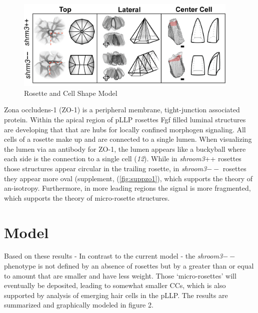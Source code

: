 \documentclass[11pt,singlespacinge,twoside]{reedthesis} %
\begin{document}
\begin{figure}

{\centering \includegraphics[width=0.95\textwidth]{figures/summary/cell-model} 

}

\caption[Rosette and Cell Shape Model]{Rosette and Cell Shape Model}\label{fig:sumcells}
\end{figure}
Zona occludens-1 (ZO-1) is a peripheral membrane, tight-junction associated protein. Within the apical region of pLLP rosettes Fgf filled luminal structures are developing that that are hubs for locally confined morphogen signaling. All cells of a rosette make up and are connected to a single lumen. When visualizing the lumen via an antibody for ZO-1, the lumen appears like a buckyball where each side is the connection to a single cell (\emph{12}). While in \emph{shroom3}++ rosettes those structures appear circular in the trailing rosette, in \emph{shroom3}\(--\) rosettes they appear more oval (supplement, (\ref{fig:suppzo1}), which supports the theory of an-isotropy. Furthermore, in more leading regions the signal is more fragmented, which supports the theory of micro-rosette structures.

\hypertarget{model-2}{%
\section{Model}\label{model-2}}

Based on these results - In contrast to the current model - the \emph{shroom3}\(--\) phenotype is not defined by an absence of rosettes but by a greater than or equal to amount that are smaller and have less weight. Those `micro-rosettes' will eventually be deposited, leading to somewhat smaller CCs, which is also supported by analysis of emerging hair cells in the pLLP. The results are summarized and graphically modeled in figure 2.
\end{document}
